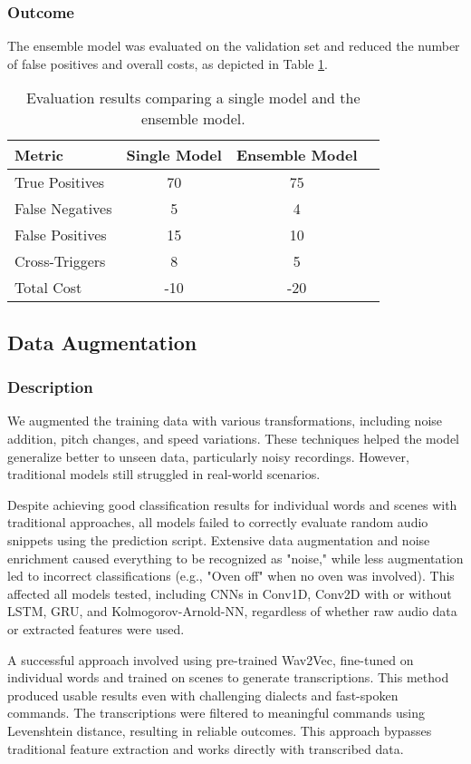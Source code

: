 \subsubsection{Outcome}
The ensemble model was evaluated on the validation set and reduced the number of false positives and overall costs, as depicted in Table \ref{tab:ensemble_results}.

\begin{table}[h]
\centering
\begin{tabular}{lccc}
\toprule
Metric & Single Model & Ensemble Model \\
\midrule
True Positives & 70 & 75 \\
False Negatives & 5 & 4 \\
False Positives & 15 & 10 \\
Cross-Triggers & 8 & 5 \\
Total Cost & -10 & -20 \\
\bottomrule
\end{tabular}
\caption{Evaluation results comparing a single model and the ensemble model.}
\label{tab:ensemble_results}
\end{table}

\subsection{Data Augmentation}
\subsubsection{Description}
We augmented the training data with various transformations, including noise addition, pitch changes, and speed variations. These techniques helped the model generalize better to unseen data, particularly noisy recordings. However, traditional models still struggled in real-world scenarios.

Despite achieving good classification results for individual words and scenes with traditional approaches, all models failed to correctly evaluate random audio snippets using the prediction script. Extensive data augmentation and noise enrichment caused everything to be recognized as "noise," while less augmentation led to incorrect classifications (e.g., "Oven off" when no oven was involved). This affected all models tested, including CNNs in Conv1D, Conv2D with or without LSTM, GRU, and Kolmogorov-Arnold-NN, regardless of whether raw audio data or extracted features were used.

A successful approach involved using pre-trained Wav2Vec, fine-tuned on individual words and trained on scenes to generate transcriptions. This method produced usable results even with challenging dialects and fast-spoken commands. The transcriptions were filtered to meaningful commands using Levenshtein distance, resulting in reliable outcomes. This approach bypasses traditional feature extraction and works directly with transcribed data.


